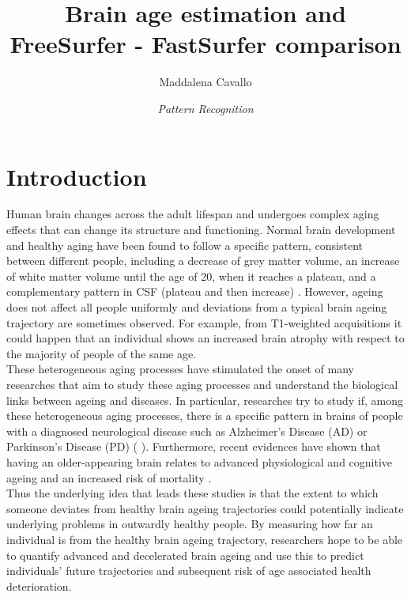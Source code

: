 \documentclass{article}
\title{\textbf{Brain age estimation and
		\\FreeSurfer - FastSurfer comparison}}
\author{Maddalena Cavallo}
\date{\textit{Pattern Recognition}}
\begin{document}
	
	\maketitle %
		
	
	
	\section{Introduction}
	\label{Introduction}
	Human brain changes across the adult lifespan and undergoes complex aging effects that can change its structure and functioning. Normal brain development and healthy aging have been found to follow a specific pattern, consistent between different people, including a decrease of grey matter volume, an increase of white matter volume until the age of 20, when it reaches a plateau, and a complementary pattern in CSF (plateau and then increase) \cite{Franke2010}.
	However, ageing does not affect all people uniformly and deviations from a typical brain ageing trajectory are sometimes observed. For example, from T1-weighted acquisitions it could happen that an individual shows an increased brain atrophy with respect to the majority of people of the same age.
	\\
	These heterogeneous aging processes have stimulated the onset of many researches that aim to study these aging processes and understand the biological links between ageing and diseases. In particular, researches try to study if, among these heterogeneous aging processes, there is a specific pattern in brains of people with a diagnosed neurological disease such as Alzheimer's Disease (AD) or Parkinson's Disease (PD) (\cite{Franke2012} \cite{Zeighami2019}).
	Furthermore, recent evidences have shown that having an older-appearing brain relates to advanced physiological and cognitive ageing and an increased risk of mortality \cite{Cole2018}.
	\\
	Thus the underlying idea that leads these studies is that the extent to which someone deviates from healthy brain ageing trajectories could potentially indicate underlying problems in outwardly healthy people. By measuring how far an individual is from the healthy brain ageing trajectory, researchers hope to be able to quantify advanced and decelerated brain ageing and use this to predict individuals' future trajectories and subsequent risk of age associated health deterioration.
\end{document}
